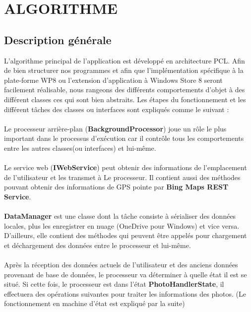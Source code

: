 \documentclass{article}
\begin{document}
\clearpage
\section{\LARGE ALGORITHME }

\vspace{0.2 cm}
\subsection{\Large Description générale}

L’algorithme principal de l’application est développé en architecture PCL. Afin de bien structurer nos programmes et afin que l’implémentation spécifique à la plate-forme WP8 ou l’extension d’application à Windows Store 8 seront facilement réalisable, nous rangeons des différents comportements d’objet à des différent classes ces qui sont bien abstraits.  Les étapes du fonctionnement et les différent tâches des classes ou interfaces sont expliqués comme le suivant :
\\\\
Le processeur arrière-plan (\textbf{BackgroundProcessor}) joue un rôle le plus important dans le processus d’exécution car il contrôle tous les comportements entre les autres classes(ou interfaces) et lui-même. 
\\\\
Le service web ({\bf IWebService}) peut obtenir des informations de l’emplacement de l’utilisateur et les transmet à Le processeur.
Il contient aussi des méthodes pouvant obtenir des informations de GPS pointe par {\bf Bing Maps REST Service}.
\\\\
{\bf DataManager} est une classe dont la tâche consiste à sérialiser des données locales, plus les enregistrer en nuage (OneDrive pour Windows)  et vice versa.  D’ailleurs, elle contient des méthodes qui peuvent être appelés pour chargement et déchargement des données entre  le processeur et lui-même.
\\\\
Après la réception des données actuels de l’utilisateur et des anciens données provenant de base de données, le processeur va déterminer à quelle état il est se situé. Si cette fois, le processeur est dans l’état {\bf PhotoHandlerState}, il effectuera des opérations suivantes pour traiter les informations des photos.  (Le fonctionnement en machine d’état est expliqué par la suite)
\end{document}
